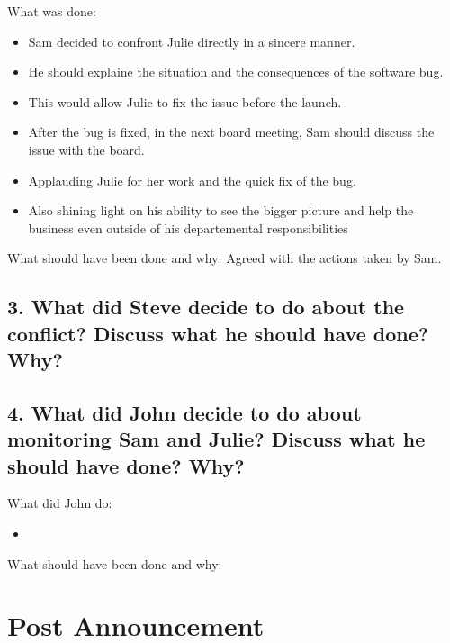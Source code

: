 \documentclass[a4paper,10pt]{article}
\begin{document}
What was done:
\begin{itemize}
    \item Sam decided to confront Julie directly in a sincere manner.
    \item He should explaine the situation and the consequences of the software bug.
    \item This would allow Julie to fix the issue before the launch.
    \item After the bug is fixed, in the next board meeting, Sam should discuss the issue with the board.
    \item Applauding Julie for her work and the quick fix of the bug.
    \item Also shining light on his ability to see the bigger picture and help the business even outside of his departemental responsibilities
\end{itemize}

What should have been done and why: Agreed with the actions taken by Sam.

\subsection{3. What did Steve decide to do about the conflict? Discuss what he should have done? Why?}

\subsection{4. What did John decide to do about monitoring Sam and Julie? Discuss what he should have done? Why?}

What did John do:
\begin{itemize}
    \item 
\end{itemize}

What should have been done and why:

\section{Post Announcement}
\end{document}
